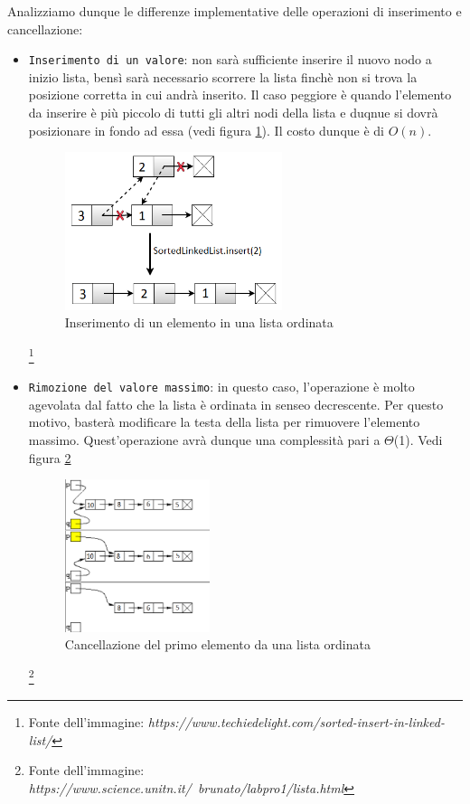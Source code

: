\documentclass{article}
\begin{document}
Analizziamo dunque le differenze implementative delle operazioni di inserimento e cancellazione:

\begin{itemize}
    \item \verb|Inserimento di un valore|: non sarà sufficiente inserire il nuovo nodo a inizio lista, bensì sarà necessario scorrere la lista finchè non si trova la posizione corretta in cui andrà inserito. Il caso peggiore è quando l'elemento da inserire è più piccolo di tutti gli altri nodi della lista e duqnue si dovrà posizionare in fondo ad essa (vedi figura \ref{fig: Linked4}). Il costo dunque è di $O(n)$.

    \begin{figure}[H]
    \includegraphics[width=0.6\textwidth]{Images/Linked4.png}
    \centering
    \caption{Inserimento di un elemento in una lista ordinata}
    \label{fig: Linked4}
    \end{figure}
    
    \footnote{Fonte dell'immagine: \textit{https://www.techiedelight.com/sorted-insert-in-linked-list/}}


    \item \verb|Rimozione del valore massimo|: in questo caso, l'operazione è molto agevolata dal fatto che la lista è ordinata in senseo decrescente. Per questo motivo, basterà modificare la testa della lista per rimuovere l'elemento massimo. Quest'operazione avrà dunque una complessità pari a $\Theta$(1). Vedi figura \ref{fig: Linked5}

    \begin{figure}[H]
    \includegraphics[width=0.4\textwidth]{Images/Linked5.png}
    \centering
    \caption{Cancellazione del primo elemento da una lista ordinata}
    \label{fig: Linked5}
    \end{figure}
    
    \footnote{Fonte dell'immagine: \textit{https://www.science.unitn.it/~brunato/labpro1/lista.html}}

\end{itemize}
\end{document}

